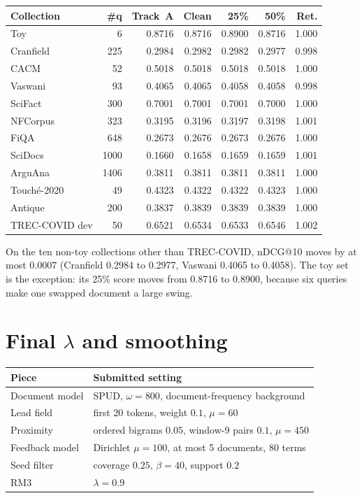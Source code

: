 \documentclass[10pt,a4paper]{article}
\begin{document}
\begin{center}
\footnotesize
\begin{tabular}{lrrrrrr}
\toprule
Collection & \#q & Track~A & Clean & 25\% & 50\% & Ret. \\
\midrule
Toy & 6 & 0.8716 & 0.8716 & 0.8900 & 0.8716 & 1.000 \\
Cranfield & 225 & 0.2984 & 0.2982 & 0.2982 & 0.2977 & 0.998 \\
CACM & 52 & 0.5018 & 0.5018 & 0.5018 & 0.5018 & 1.000 \\
Vaswani & 93 & 0.4065 & 0.4065 & 0.4058 & 0.4058 & 0.998 \\
SciFact & 300 & 0.7001 & 0.7001 & 0.7001 & 0.7000 & 1.000 \\
NFCorpus & 323 & 0.3195 & 0.3196 & 0.3197 & 0.3198 & 1.001 \\
FiQA & 648 & 0.2673 & 0.2676 & 0.2673 & 0.2676 & 1.000 \\
SciDocs & 1000 & 0.1660 & 0.1658 & 0.1659 & 0.1659 & 1.001 \\
ArguAna & 1406 & 0.3811 & 0.3811 & 0.3811 & 0.3811 & 1.000 \\
Touch\'e-2020 & 49 & 0.4323 & 0.4322 & 0.4322 & 0.4323 & 1.000 \\
Antique & 200 & 0.3837 & 0.3839 & 0.3839 & 0.3839 & 1.000 \\
TREC-COVID dev & 50 & 0.6521 & 0.6534 & 0.6533 & 0.6546 & 1.002 \\
\bottomrule
\end{tabular}
\end{center}

On the ten non-toy collections other than TREC-COVID, nDCG@10 moves by at most $0.0007$ (Cranfield 0.2984 to 0.2977, Vaswani 0.4065 to 0.4058). The toy set is the exception: its 25\% score moves from 0.8716 to 0.8900, because six queries make one swapped document a large swing.

\section{Final $\lambda$ and smoothing}

\begin{center}
\scriptsize
\begin{tabular}{ll}
\toprule
Piece & Submitted setting \\
\midrule
Document model & SPUD, $\omega{=}800$, document-frequency background \\
Lead field & first 20 tokens, weight $0.1$, $\mu{=}60$ \\
Proximity & ordered bigrams $0.05$, window-9 pairs $0.1$, $\mu{=}450$ \\
Feedback model & Dirichlet $\mu{=}100$, at most 5 documents, 80 terms \\
Seed filter & coverage $0.25$, $\beta{=}40$, support $0.2$ \\
RM3 & $\lambda{=}0.9$ \\
\bottomrule
\end{tabular}
\end{center}
\end{document}
